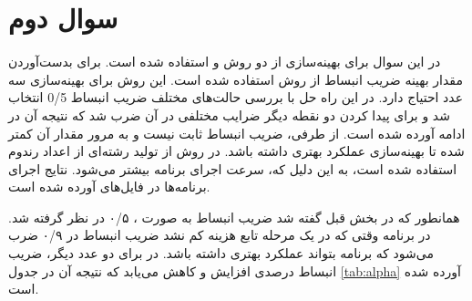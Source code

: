 \section{سوال دوم}
در این سوال برای بهینه‌سازی از دو روش
و
استفاده شده‌ است.
برای بدست‌آوردن مقدار بهینه ضریب انبساط از روش
استفاده شده است. این روش برای بهینه‌سازی سه عدد احتیاج دارد. در این راه حل با بررسی حالت‌های مختلف ضریب انبساط 0/5 انتخاب شد و برای پیدا کردن دو نقطه دیگر ضرایب مختلفی در آن ضرب شد که نتیجه آن در ادامه آورده شده است. از طرفی، ضریب انبساط ثابت نیست و به مرور مقدار آن کمتر شده تا بهینه‌سازی عملکرد بهتری داشته باشد.
در روش  
از تولید رشته‌ای از اعداد رندوم استفاده شده است، به این دلیل که، سرعت اجرای برنامه بیشتر می‌شود. نتایج اجرای برنامه‌ها در فایل‌های 
آورده شده است.



همانطور که در بخش قبل گفته شد ضریب انبساط به صورت ،
۰/۵ در نظر گرفته شد. در برنامه وقتی که در یک مرحله تابع هزینه کم نشد ضریب انبساط در ۰/۹ ضرب می‌شود که برنامه بتواند عملکرد بهتری داشته باشد. در 
برای دو عدد دیگر، ضریب انبساط درصدی افزایش و کاهش می‌یابد که نتیجه آن در جدول 
\ref{tab:alpha}
آورده شده است.



\newpage




